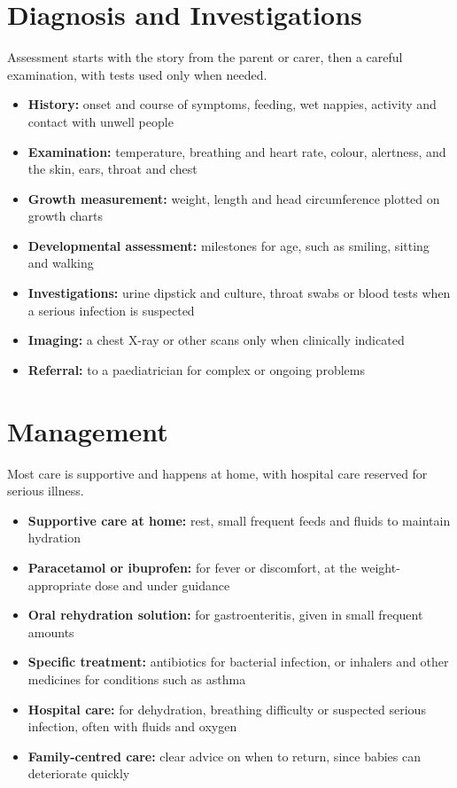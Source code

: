 \section*{Diagnosis and Investigations}
Assessment starts with the story from the parent or carer, then a careful examination, with tests used only when needed.

\begin{itemize}
    \item \textbf{History:} onset and course of symptoms, feeding, wet nappies, activity and contact with unwell people
    \item \textbf{Examination:} temperature, breathing and heart rate, colour, alertness, and the skin, ears, throat and chest
    \item \textbf{Growth measurement:} weight, length and head circumference plotted on growth charts
    \item \textbf{Developmental assessment:} milestones for age, such as smiling, sitting and walking
    \item \textbf{Investigations:} urine dipstick and culture, throat swabs or blood tests when a serious infection is suspected
    \item \textbf{Imaging:} a chest X-ray or other scans only when clinically indicated
    \item \textbf{Referral:} to a paediatrician for complex or ongoing problems
\end{itemize}

\section*{Management}
Most care is supportive and happens at home, with hospital care reserved for serious illness.

\begin{itemize}
    \item \textbf{Supportive care at home:} rest, small frequent feeds and fluids to maintain hydration
    \item \textbf{Paracetamol or ibuprofen:} for fever or discomfort, at the weight-appropriate dose and under guidance
    \item \textbf{Oral rehydration solution:} for gastroenteritis, given in small frequent amounts
    \item \textbf{Specific treatment:} antibiotics for bacterial infection, or inhalers and other medicines for conditions such as asthma
    \item \textbf{Hospital care:} for dehydration, breathing difficulty or suspected serious infection, often with fluids and oxygen
    \item \textbf{Family-centred care:} clear advice on when to return, since babies can deteriorate quickly
\end{itemize}

